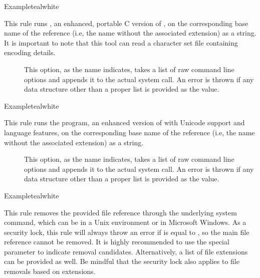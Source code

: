\begin{description}
\begin{codebox}{Example}{teal}{\icnote}{white}
\end{codebox}

\item[\rulebox{bibtex8}{Marco Daniel, Paulo Cereda}] This rule runs , an enhanced, portable C version of , on the corresponding base name of the  reference (i.e, the name without the associated extension) as a string. It is important to note that this tool can read a character set file containing encoding details.

\begin{description}
\item[] This option, as the name indicates, takes a list of raw command line options and appends it to the actual system call. An error is thrown if any data structure other than a proper list is provided as the value.
\end{description}

\begin{codebox}{Example}{teal}{\icnote}{white}
\end{codebox}

\item[\rulebox{bibtexu}{Marco Daniel, Paulo Cereda}] This rule runs the  program, an enhanced version of  with Unicode support and language features, on the corresponding base name of the  reference (i.e, the name without the associated extension) as a string.

\begin{description}
\item[] This option, as the name indicates, takes a list of raw command line options and appends it to the actual system call. An error is thrown if any data structure other than a proper list is provided as the value.
\end{description}

\begin{codebox}{Example}{teal}{\icnote}{white}
\end{codebox}

\item[\rulebox{clean}{Marco Daniel, Paulo Cereda}] This rule removes the provided file reference through the underlying system command, which can be  in a Unix environment or  in Microsoft Windows. As a security lock, this rule will always throw an error if  is equal to , so the main file reference cannot be removed. It is highly recommended to use the special  parameter to indicate removal candidates. Alternatively, a list of file extensions can be provided as well. Be mindful that the security lock also applies to file removals based on extensions.


\end{description}

